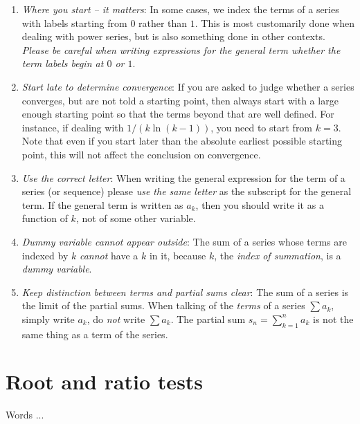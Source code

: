 \documentclass[10pt]{amsart}
\begin{document}
\begin{enumerate}
\item {\em Where you start -- it matters}: In some cases, we index the
  terms of a series with labels starting from $0$ rather than
  $1$. This is most customarily done when dealing with power series,
  but is also something done in other contexts. {\em Please be careful
  when writing expressions for the general term whether the term
  labels begin at $0$ or $1$}.
\item {\em Start late to determine convergence}: If you are asked to
  judge whether a series converges, but are not told a starting point,
  then always start with a large enough starting point so that the
  terms beyond that are well defined. For instance, if dealing with
  $1/(k\ln(k - 1))$, you need to start from $k = 3$. Note that even if
  you start later than the absolute earliest possible starting point,
  this will not affect the conclusion on convergence.
\item {\em Use the correct letter}: When writing the general expression
  for the term of a series (or sequence) please {\em use the same
  letter} as the subscript for the general term. If the general term
  is written as $a_k$, then you should write it as a function of $k$,
  not of some other variable.
\item {\em Dummy variable cannot appear outside}: The sum of a series
  whose terms are indexed by $k$ {\em cannot} have a $k$ in it,
  because $k$, the {\em index of summation}, is a {\em dummy
  variable}.
\item {\em Keep distinction between terms and partial sums clear}: The
  sum of a series is the limit of the partial sums. When talking of
  the {\em terms} of a series $\sum a_k$, simply write $a_k$, do {\em
  not} write $\sum a_k$. The partial sum $s_n = \sum_{k=1}^n a_k$ is
  not the same thing as a term of the series.
\end{enumerate}

\section{Root and ratio tests}

Words ...
\end{document}
